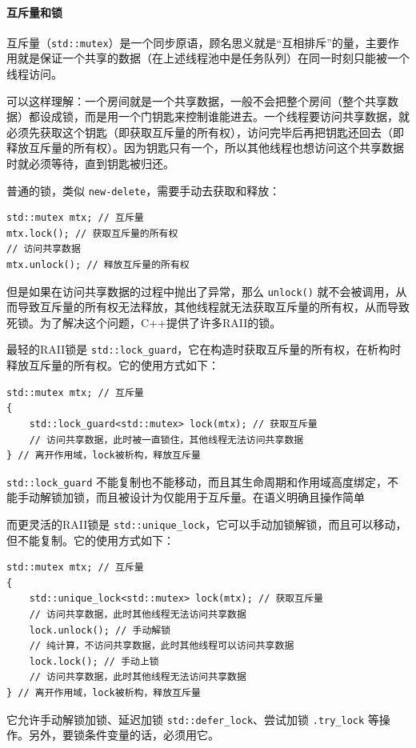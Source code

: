 \paragraph{互斥量和锁} 互斥量（\verb|std::mutex|）是一个同步原语，顾名思义就是“互相排斥”的量，主要作用就是保证一个共享的数据（在上述线程池中是任务队列）在同一时刻只能被一个线程访问。

可以这样理解：一个房间就是一个共享数据，一般不会把整个房间（整个共享数据）都设成锁，而是用一个门钥匙来控制谁能进去。一个线程要访问共享数据，就必须先获取这个钥匙（即获取互斥量的所有权），访问完毕后再把钥匙还回去（即释放互斥量的所有权）。因为钥匙只有一个，所以其他线程也想访问这个共享数据时就必须等待，直到钥匙被归还。

普通的锁，类似 \verb|new-delete|，需要手动去获取和释放：
\begin{verbatim}
std::mutex mtx; // 互斥量
mtx.lock(); // 获取互斥量的所有权
// 访问共享数据
mtx.unlock(); // 释放互斥量的所有权
\end{verbatim}
但是如果在访问共享数据的过程中抛出了异常，那么 \verb|unlock()| 就不会被调用，从而导致互斥量的所有权无法释放，其他线程就无法获取互斥量的所有权，从而导致死锁。为了解决这个问题，C++提供了许多RAII的锁。

最轻的RAII锁是 \verb|std::lock_guard|，它在构造时获取互斥量的所有权，在析构时释放互斥量的所有权。它的使用方式如下：
\begin{verbatim}
std::mutex mtx; // 互斥量
{
    std::lock_guard<std::mutex> lock(mtx); // 获取互斥量
    // 访问共享数据，此时被一直锁住，其他线程无法访问共享数据
} // 离开作用域，lock被析构，释放互斥量
\end{verbatim}
\verb|std::lock_guard| 不能复制也不能移动，而且其生命周期和作用域高度绑定，不能手动解锁加锁，而且被设计为仅能用于互斥量。在语义明确且操作简单

而更灵活的RAII锁是 \verb|std::unique_lock|，它可以手动加锁解锁，而且可以移动，但不能复制。它的使用方式如下：
\begin{verbatim}
std::mutex mtx; // 互斥量
{
    std::unique_lock<std::mutex> lock(mtx); // 获取互斥量
    // 访问共享数据，此时其他线程无法访问共享数据
    lock.unlock(); // 手动解锁
    // 纯计算，不访问共享数据，此时其他线程可以访问共享数据
    lock.lock(); // 手动上锁
    // 访问共享数据，此时其他线程无法访问共享数据
} // 离开作用域，lock被析构，释放互斥量
\end{verbatim}
它允许手动解锁加锁、延迟加锁 \verb|std::defer_lock|、尝试加锁 \verb|.try_lock| 等操作。另外，要锁条件变量的话，必须用它。

